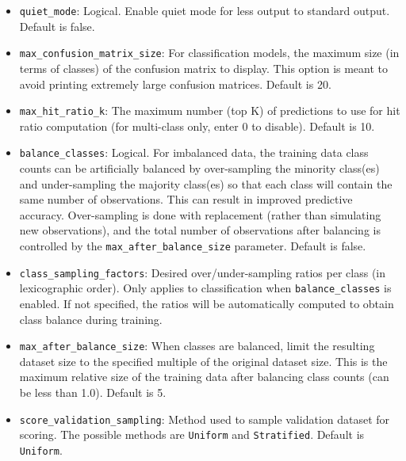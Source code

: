 \begin{itemize}
\item \texttt{quiet\_mode}: Logical. Enable quiet mode for less output to standard output. Default is false.

\item \texttt{max\_confusion\_matrix\_size}: For classification models, the maximum size (in terms of classes) of the confusion matrix to display. This option is meant to avoid printing extremely large confusion matrices. Default is 20.

\item \texttt{max\_hit\_ratio\_k}: The maximum number (top K) of predictions to use for hit ratio computation (for multi-class only, enter 0 to disable). Default is 10.

\item \texttt{balance\_classes}: Logical. For imbalanced data, the training data class counts can be artificially balanced by over-sampling the minority class(es) and under-sampling the majority class(es) so that each class will contain the same number of observations.  This can result in improved predictive accuracy.  Over-sampling is done with replacement (rather than simulating new observations), and the total number of observations after balancing is controlled by the \texttt{max\_after\_balance\_size} parameter.  Default is false.

\item \texttt{class\_sampling\_factors}: Desired over/under-sampling ratios per class (in lexicographic order). Only applies to classification when \texttt{balance\_classes} is enabled. If not specified, the ratios will be automatically computed to obtain class balance during training.

\item \texttt{max\_after\_balance\_size}: When classes are balanced, limit the resulting dataset size to the specified multiple of the original dataset size. This is the maximum relative size of the training data after balancing class counts (can be less than 1.0). Default is 5.

\item \texttt{score\_validation\_sampling}: Method used to sample validation dataset for scoring. The possible methods are \texttt{Uniform} and \texttt{Stratified}. Default is \texttt{Uniform}.


\end{itemize}
